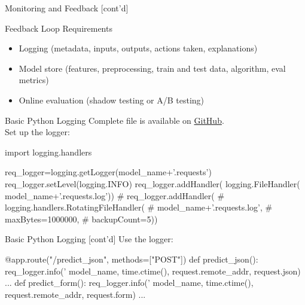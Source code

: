 \documentclass[ignorenonframetext,xcolor=x11names]{beamer}
\begin{document}
\begin{frame}{Monitoring and Feedback \small [cont'd]}
\begin{block}{Feedback Loop Requirements}
\begin{itemize}
   \item Logging (metadata, inputs, outputs, actions taken, explanations)
   \item Model store (features, preprocessing, train and test data, algorithm, eval metrics)
   \item Online evaluation (shadow testing or A/B testing)
\end{itemize}
\end{block}
\end{frame}


\begin{frame}[fragile]{Basic Python Logging}
Complete file is available on \href{https://github.com/jevermann/busi4720-mlops/blob/main/flask_deploy_logging.py}{GitHub}. \\

Set up the logger:
\begin{pythoncode}
import logging.handlers

req_logger=logging.getLogger(model_name+'.requests')
req_logger.setLevel(logging.INFO)
req_logger.addHandler(
    logging.FileHandler(
        model_name+'.requests.log'))
# req_logger.addHandler(
#     logging.handlers.RotatingFileHandler(
#         model_name+'.requests.log',
#         maxBytes=1000000,
#         backupCount=5))
\end{pythoncode}
\end{frame}

\begin{frame}[fragile]{Basic Python Logging \small [cont'd]}
Use the logger:
\begin{pythoncode}
@app.route("/predict_json", methods=["POST"])
def predict_json():
    req_logger.info('%
                    model_name, 
                    time.ctime(), 
                    request.remote_addr, 
                    request.json)
...
def predict_form():
    req_logger.info('%
                    model_name,
                    time.ctime(),
                    request.remote_addr,
                    request.form)
...
\end{pythoncode}
\end{frame}
\end{document}
